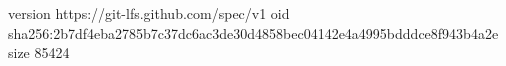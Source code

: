 version https://git-lfs.github.com/spec/v1
oid sha256:2b7df4eba2785b7c37dc6ac3de30d4858bec04142e4a4995bdddce8f943b4a2e
size 85424
